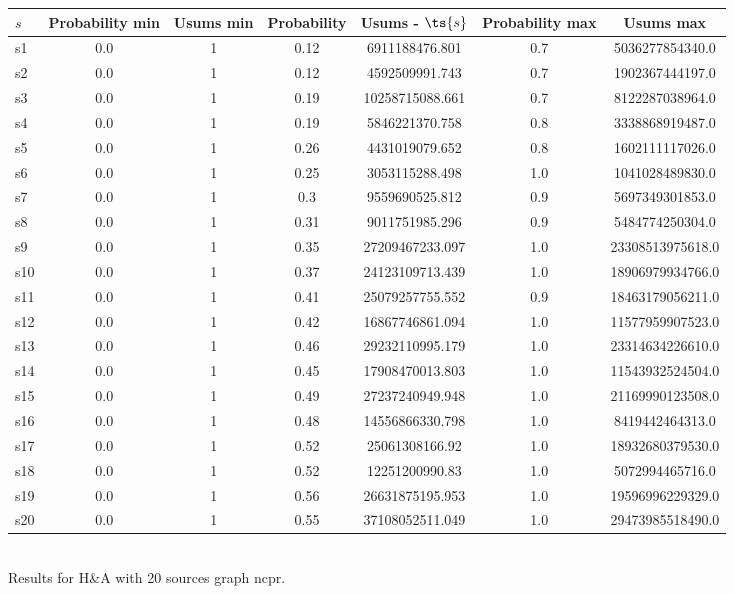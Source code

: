 \documentclass{article}
\begin{document}
\noindent\begin{tabular}{|l|c|c|c|c|c|c|}
\hline
$s$& Probability min & Usums min & Probability & Usums - $\ts{s}$ & Probability max & Usums max\\
\hline
s1 &0.0 & 1 & 0.12 & 6911188476.801 & 0.7 & 5036277854340.0\\
\hline
s2 &0.0 & 1 & 0.12 & 4592509991.743 & 0.7 & 1902367444197.0\\
\hline
s3 &0.0 & 1 & 0.19 & 10258715088.661 & 0.7 & 8122287038964.0\\
\hline
s4 &0.0 & 1 & 0.19 & 5846221370.758 & 0.8 & 3338868919487.0\\
\hline
s5 &0.0 & 1 & 0.26 & 4431019079.652 & 0.8 & 1602111117026.0\\
\hline
s6 &0.0 & 1 & 0.25 & 3053115288.498 & 1.0 & 1041028489830.0\\
\hline
s7 &0.0 & 1 & 0.3 & 9559690525.812 & 0.9 & 5697349301853.0\\
\hline
s8 &0.0 & 1 & 0.31 & 9011751985.296 & 0.9 & 5484774250304.0\\
\hline
s9 &0.0 & 1 & 0.35 & 27209467233.097 & 1.0 & 23308513975618.0\\
\hline
s10 &0.0 & 1 & 0.37 & 24123109713.439 & 1.0 & 18906979934766.0\\
\hline
s11 &0.0 & 1 & 0.41 & 25079257755.552 & 0.9 & 18463179056211.0\\
\hline
s12 &0.0 & 1 & 0.42 & 16867746861.094 & 1.0 & 11577959907523.0\\
\hline
s13 &0.0 & 1 & 0.46 & 29232110995.179 & 1.0 & 23314634226610.0\\
\hline
s14 &0.0 & 1 & 0.45 & 17908470013.803 & 1.0 & 11543932524504.0\\
\hline
s15 &0.0 & 1 & 0.49 & 27237240949.948 & 1.0 & 21169990123508.0\\
\hline
s16 &0.0 & 1 & 0.48 & 14556866330.798 & 1.0 & 8419442464313.0\\
\hline
s17 &0.0 & 1 & 0.52 & 25061308166.92 & 1.0 & 18932680379530.0\\
\hline
s18 &0.0 & 1 & 0.52 & 12251200990.83 & 1.0 & 5072994465716.0\\
\hline
s19 &0.0 & 1 & 0.56 & 26631875195.953 & 1.0 & 19596996229329.0\\
\hline
s20 &0.0 & 1 & 0.55 & 37108052511.049 & 1.0 & 29473985518490.0\\
\hline
\end{tabular}\\

\noindent Results for H\&A with 20 sources graph ncpr.
\end{document}
